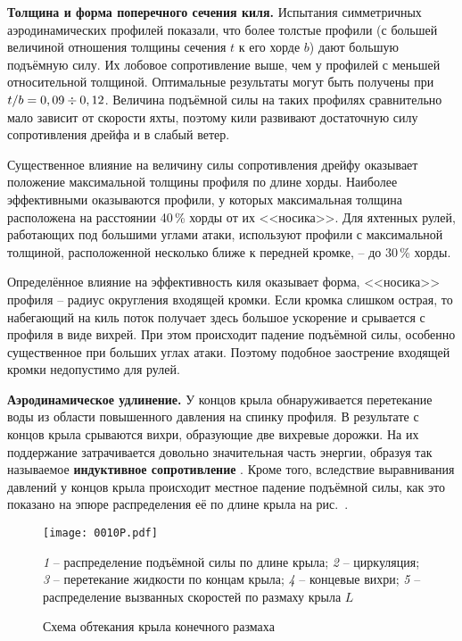 \textbf{Толщина и форма поперечного сечения киля.} Испытания
симметричных аэродинамических профилей показали, что более толстые
профили (с большей величиной отношения толщины сечения $t$ к его хорде
$b$) дают большую подъёмную силу. Их лобовое сопротивление выше, чем у
профилей с меньшей относительной толщиной. Оптимальные результаты
могут быть получены при $t/b = 0,09 \div 0,12$. Величина подъёмной
силы на таких профилях сравнительно мало зависит от скорости яхты,
поэтому кили развивают достаточную силу сопротивления дрейфа и в
слабый ветер.

Существенное влияние на величину силы сопротивления дрейфу оказывает
положение максимальной толщины профиля по длине хорды. Наиболее
эффективными оказываются профили, у которых максимальная толщина
расположена на расстоянии 40\,\% хорды от их <<носика>>. Для
яхтенных рулей, работающих под большими углами атаки, используют
профили с максимальной толщиной, расположенной несколько ближе к
передней кромке, \--- до 30\,\% хорды.

Определённое влияние на эффективность киля оказывает форма, <<носика>>
профиля \--- радиус округления входящей кромки. Если кромка слишком
острая, то набегающий на киль поток получает здесь большое ускорение и
срывается с профиля в виде вихрей. При этом происходит падение
подъёмной силы, особенно существенное при больших углах атаки. Поэтому
подобное заострение входящей кромки недопустимо для рулей.

\textbf{Аэродинамическое удлинение.}
У концов крыла обнаруживается
перетекание воды из области повышенного давления на спинку профиля. В
результате с концов крыла срываются вихри, образующие две вихревые
дорожки. На их поддержание затрачивается довольно значительная часть
энергии, образуя так называемое \textbf{индуктивное сопротивление}
. Кроме того,
вследствие выравнивания давлений у концов крыла происходит местное
падение подъёмной силы, как это показано на эпюре распределения её по
длине крыла на рис.~.

\begin{figure*}[htb]
  \centering
  \texttt{[image: 0010P.pdf]}
  \caption{Схема обтекания крыла конечного размаха}
  \label{fig:10}
  \centering
  \small
  \textit{1} \--- распределение подъёмной силы по длине крыла;
  \textit{2} \--- циркуляция;
  \textit{3} \--- перетекание жидкости по концам крыла;
  \textit{4} \--- концевые вихри;
  \textit{5} \--- распределение вызванных скоростей по размаху крыла $L$
\end{figure*}

